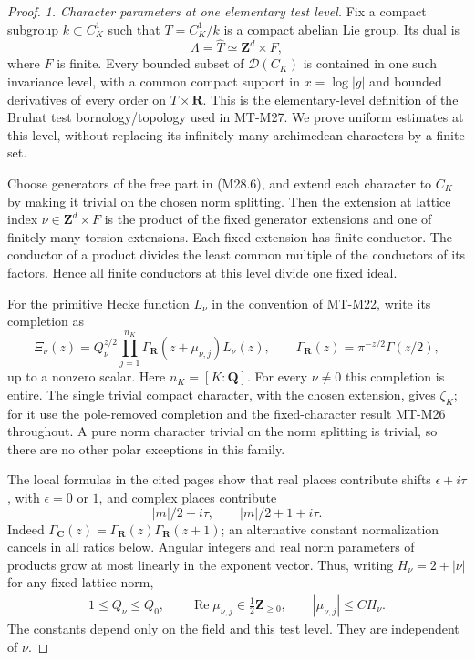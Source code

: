 \begin{proof}
\emph{1. Character parameters at one elementary test level.}
Fix a compact subgroup \(k\subset C_K^1\) such that
\(T=C_K^1/k\) is a compact abelian Lie group. Its dual is
\[
                  \Lambda=\widehat T\simeq\mathbf Z^d\times F,
                                                               \tag{M28.6}
\]
where \(F\) is finite. Every bounded subset of
\(\mathcal D(C_K)\) is contained in one such invariance
level, with a common compact support in \(x=\log|g|\)
and bounded derivatives of every order on \(T\times\mathbf R\).
This is the elementary-level definition of the Bruhat test
bornology/topology used in MT-M27. We prove uniform estimates
at this level, without replacing its infinitely many
archimedean characters by a finite set.

Choose generators of the free part in (M28.6), and extend
each character to \(C_K\) by making it trivial on the chosen
norm splitting. Then the extension at lattice index
\(\nu\in\mathbf Z^d\times F\) is the product of the fixed
generator extensions and one of finitely many torsion
extensions. Each fixed extension has finite conductor.
The conductor of a product divides the least common
multiple of the conductors of its factors. Hence all finite
conductors at this level divide one fixed ideal.

For the primitive Hecke function \(L_\nu\) in the convention
of MT-M22, write its completion as
\[
 \Xi_\nu(z)=Q_\nu^{z/2}
      \prod_{j=1}^{n_K}\Gamma_{\mathbf R}(z+\mu_{\nu,j})L_\nu(z),
 \qquad \Gamma_{\mathbf R}(z)=\pi^{-z/2}\Gamma(z/2),
                                                               \tag{M28.7}
\]
up to a nonzero scalar. Here \(n_K=[K:\mathbf Q]\).
For every \(\nu\ne0\) this completion is entire. The
single trivial compact character, with the chosen extension,
gives \(\zeta_K\); for it use the pole-removed completion
and the fixed-character result MT-M26 throughout. A pure
norm character trivial on the norm splitting is trivial,
so there are no other polar exceptions in this family.

The local formulas in the cited pages show that real
places contribute shifts \(\epsilon+i\tau\), with
\(\epsilon=0\) or \(1\), and complex places contribute
\[
      |m|/2+i\tau,\qquad |m|/2+1+i\tau.
 \]
Indeed
\(\Gamma_{\mathbf C}(z)=
\Gamma_{\mathbf R}(z)\Gamma_{\mathbf R}(z+1)\);
an alternative constant normalization cancels in all
ratios below. Angular integers and real norm parameters
of products grow at most linearly in the exponent vector.
Thus, writing \(H_\nu=2+|\nu|\) for any fixed lattice norm,
\[
 \begin{gathered}
  1\le Q_\nu\le Q_0,\qquad
  \operatorname{Re}\mu_{\nu,j}\in\tfrac12\mathbf Z_{\ge0},
  \qquad |\mu_{\nu,j}|\le C H_\nu .
 \end{gathered}                                                 \tag{M28.8}
\]
The constants depend only on the field and this test level.
They are independent of \(\nu\).


\end{proof}
